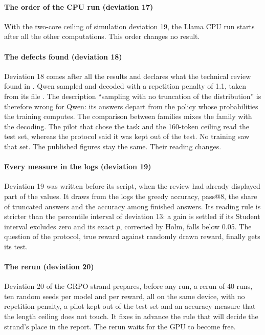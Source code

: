 \paragraph{The order of the CPU run (deviation 17)} With the two-core ceiling of simulation
deviation 19, the Llama CPU run starts after all the other computations. This order changes no
result.

\paragraph{The defects found (deviation 18)} Deviation 18 comes after all the
results and declares what the technical review found in . Qwen sampled and decoded with a
repetition penalty of 1.1, taken from its file . The description
\enquote{sampling with no truncation of the distribution} is therefore wrong for Qwen: its answers
depart from the policy whose probabilities the training computes. The comparison between families
mixes the family with the decoding. The pilot that chose the task and the 160-token ceiling read the
test set, whereas the protocol said it was kept out of the test. No training saw that set. The
published figures stay the same. Their reading changes.

\paragraph{Every measure in the logs (deviation 19)} Deviation 19 was written before its script, when
the review had already displayed part of the values. It draws from the logs the greedy accuracy,
pass@8, the share of truncated answers and the accuracy among finished answers. Its reading rule is
stricter than the percentile interval of deviation 13: a gain is settled if its Student interval
excludes zero and its exact $p$, corrected by Holm, falls below 0.05. The question of the protocol,
true reward against randomly drawn reward, finally gets its test.

\paragraph{The rerun (deviation 20)} Deviation 20 of the GRPO strand prepares,
before any run, a rerun of 40 runs, ten random seeds per model and per reward, all on the same device, with
no repetition penalty, a pilot kept out of the test set and an accuracy measure that the length
ceiling does not touch. It fixes in advance the rule that will decide the strand's place in the
report. The rerun waits for the GPU to become free.

